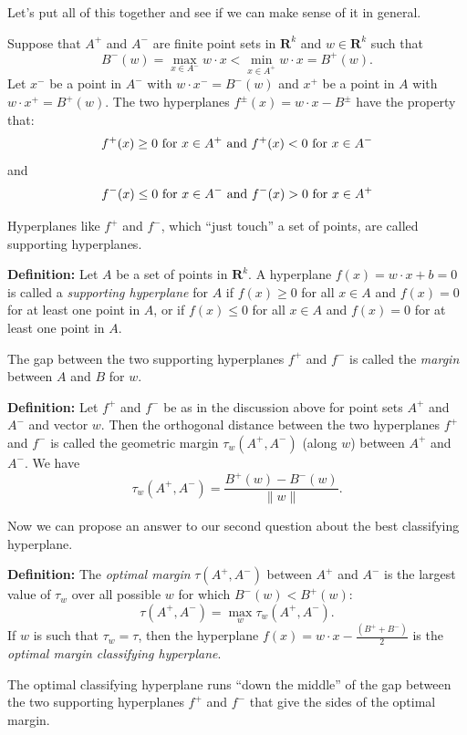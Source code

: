 \documentclass[
  oneside]{scrbook}
\begin{document}
Let's put all of this together and see if we can make sense of it in
general.

Suppose that \(A^{+}\) and \(A^{-}\) are finite point sets in
\(\mathbf{R}^{k}\) and \(w\in\mathbf{R}^{k}\) such that \[
B^{-}(w)=\max_{x\in A^{-}}w\cdot x < \min_{x\in A^{+}}w\cdot x=B^{+}(w).
\] Let \(x^{-}\) be a point in \(A^{-}\) with \(w\cdot x^{-}=B^{-}(w)\)
and \(x^{+}\) be a point in \(A\) with \(w\cdot x^{+}=B^{+}(w)\). The
two hyperplanes \(f^{\pm}(x) = w\cdot x - B^{\pm}\) have the property
that: \[
f^{+}(x)\ge 0\hbox{ for }x\in A^{+}\hbox{ and }f^{+}(x)<0\hbox{ for }x\in A^{-}
\] and \[
f^{-}(x)\le 0\hbox{ for }x\in A^{-}\hbox{ and }f^{-}(x)>0\hbox{ for }x\in A^{+}
\]

Hyperplanes like \(f^{+}\) and \(f^{-}\), which ``just touch'' a set of
points, are called supporting hyperplanes.

\textbf{Definition:} Let \(A\) be a set of points in \(\mathbf{R}^{k}\).
A hyperplane \(f(x)=w\cdot x+b=0\) is called a \emph{supporting
hyperplane} for \(A\) if \(f(x)\ge 0\) for all \(x\in A\) and \(f(x)=0\)
for at least one point in \(A\), or if \(f(x)\le 0\) for all \(x\in A\)
and \(f(x)=0\) for at least one point in \(A\).

The gap between the two supporting hyperplanes \(f^{+}\) and \(f^{-}\)
is called the \emph{margin} between \(A\) and \(B\) for \(w\).

\textbf{Definition:} Let \(f^{+}\) and \(f^{-}\) be as in the discussion
above for point sets \(A^{+}\) and \(A^{-}\) and vector \(w\). Then the
orthogonal distance between the two hyperplanes \(f^{+}\) and \(f^{-}\)
is called the geometric margin \(\tau_{w}(A^{+},A^{-})\) (along \(w\))
between \(A^{+}\) and \(A^{-}\). We have \[
\tau_{w}(A^{+},A^{-})=\frac{B^{+}(w)-B^{-}(w)}{\|w\|}.
\]

Now we can propose an answer to our second question about the best
classifying hyperplane.

\textbf{Definition:} The \emph{optimal margin} \(\tau(A^{+},A^{-})\)
between \(A^{+}\) and \(A^{-}\) is the largest value of \(\tau_{w}\)
over all possible \(w\) for which \(B^{-}(w)<B^{+}(w)\): \[
\tau(A^{+},A^{-}) = \max_{w} \tau_{w}(A^{+},A^{-}).
\] If \(w\) is such that \(\tau_{w}=\tau\), then the hyperplane
\(f(x)=w\cdot x - \frac{(B^{+}+B^{-})}{2}\) is the \emph{optimal margin
classifying hyperplane}.

The optimal classifying hyperplane runs ``down the middle'' of the gap
between the two supporting hyperplanes \(f^{+}\) and \(f^{-}\) that give
the sides of the optimal margin.
\end{document}
